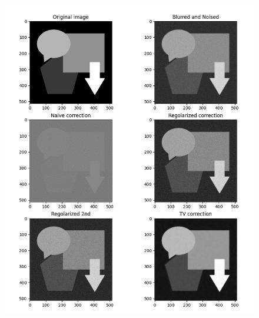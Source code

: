 \documentclass[12pt]{article}
\begin{document}
    \begin{figure}[h!]
    \centering
    \includegraphics[width=14cm]{sample4}
    \end{figure}
    \newpage
\end{document}
